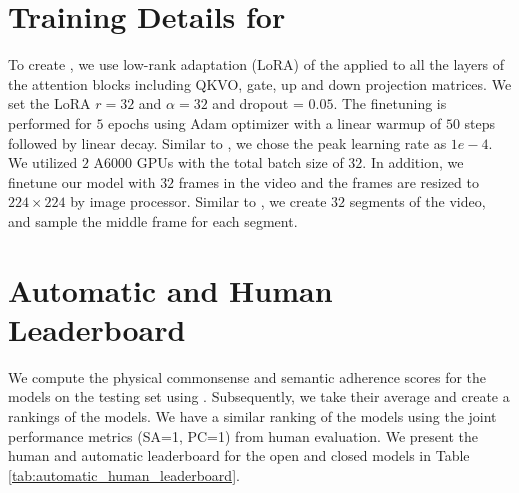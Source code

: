 \section{Training Details for \model{}}
\label{app:training_details}

To create \model{}, we use low-rank adaptation (LoRA) \cite{hu2021lora} of the \videocon{} applied to all the layers of the attention blocks including QKVO, gate, up and down projection matrices. We set the LoRA $r=32$ and $\alpha=32$ and dropout = $0.05$. The finetuning is performed for $5$ epochs using Adam \cite{kingma2014adam} optimizer with a linear warmup of $50$ steps followed by linear decay. Similar to \cite{bansal2023videocon}, we chose the peak learning rate as $1e-4$. We utilized $2$ A6000 GPUs with the total batch size of $32$. In addition, we finetune our model with $32$ frames in the video and the frames are resized to $224 \times 224$ by image processor. Similar to \cite{mplugowlvideo,ye2023mplug}, we create $32$ segments of the video, and sample the middle frame for each segment.


\section{Automatic and Human Leaderboard}
\label{app:automatic_leaderboard}

We compute the physical commonsense and semantic adherence scores for the models on the testing set using \model{}. Subsequently, we take their average and create a rankings of the models. We have a similar ranking of the models using the joint performance metrics (SA=1, PC=1) from human evaluation.
We present the human and automatic leaderboard for the open and closed models in Table \ref{tab:automatic_human_leaderboard}. 


